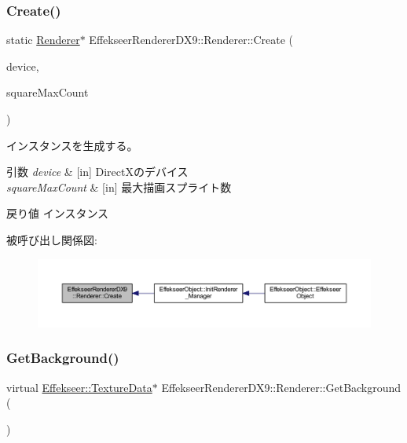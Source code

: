 \subsubsection{\texorpdfstring{Create()}{Create()}}
{\footnotesize\ttfamily static \mbox{\hyperlink{class_effekseer_renderer_d_x9_1_1_renderer}{Renderer}}$\ast$ Effekseer\+Renderer\+D\+X9\+::\+Renderer\+::\+Create (\begin{DoxyParamCaption}\item[{L\+P\+D\+I\+R\+E\+C\+T3\+D\+D\+E\+V\+I\+C\+E9}]{device,  }\item[{int32\+\_\+t}]{square\+Max\+Count }\end{DoxyParamCaption})\hspace{0.3cm}{\ttfamily [static]}}



インスタンスを生成する。 


\begin{DoxyParams}{引数}
{\em device} & \mbox{[}in\mbox{]} Direct\+Xのデバイス \\
\hline
{\em square\+Max\+Count} & \mbox{[}in\mbox{]} 最大描画スプライト数 \\
\hline
\end{DoxyParams}
\begin{DoxyReturn}{戻り値}
インスタンス 
\end{DoxyReturn}
被呼び出し関係図\+:\nopagebreak
\begin{figure}[H]
\begin{center}
\leavevmode
\includegraphics[width=350pt]{class_effekseer_renderer_d_x9_1_1_renderer_aadd9f57a16e8291dccd27d2e1c03edc4_icgraph}
\end{center}
\end{figure}
\mbox{\label{class_effekseer_renderer_d_x9_1_1_renderer_a98f5bc52650df1982e9fb75b3c735d65}} 
\subsubsection{\texorpdfstring{Get\+Background()}{GetBackground()}}
{\footnotesize\ttfamily virtual \mbox{\hyperlink{struct_effekseer_1_1_texture_data}{Effekseer\+::\+Texture\+Data}}$\ast$ Effekseer\+Renderer\+D\+X9\+::\+Renderer\+::\+Get\+Background (\begin{DoxyParamCaption}{ }\end{DoxyParamCaption})\hspace{0.3cm}{\ttfamily [pure virtual]}}



